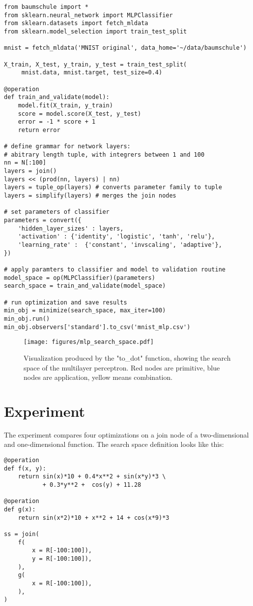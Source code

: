 \documentclass[english]{article}
\begin{document}
\begin{verbatim}
from baumschule import *
from sklearn.neural_network import MLPClassifier
from sklearn.datasets import fetch_mldata
from sklearn.model_selection import train_test_split

mnist = fetch_mldata('MNIST original', data_home='~/data/baumschule')

X_train, X_test, y_train, y_test = train_test_split(
     mnist.data, mnist.target, test_size=0.4)

@operation
def train_and_validate(model):
    model.fit(X_train, y_train)
    score = model.score(X_test, y_test)
    error = -1 * score + 1
    return error

# define grammar for network layers:
# abitrary length tuple, with integrers between 1 and 100
nn = N[:100]
layers = join()
layers << (prod(nn, layers) | nn)
layers = tuple_op(layers) # converts parameter family to tuple
layers = simplify(layers) # merges the join nodes

# set parameters of classifier
parameters = convert({
    'hidden_layer_sizes' : layers,
    'activation' : {'identity', 'logistic', 'tanh', 'relu'},
    'learning_rate' :  {'constant', 'invscaling', 'adaptive'},
})

# apply paramters to classifier and model to validation routine
model_space = op(MLPClassifier)(parameters)
search_space = train_and_validate(model_space)

# run optimization and save results
min_obj = minimize(search_space, max_iter=100)
min_obj.run()
min_obj.observers['standard'].to_csv('mnist_mlp.csv')

\end{verbatim}

\begin{figure}
  \texttt{[image: figures/mlp\_search\_space.pdf]}
  \caption{Visualization produced by the "to\_dot" function, showing the search space of the multilayer perceptron. Red nodes are primitive, blue nodes are application, yellow means combination.}
  \label{mlp_search_space}
\end{figure}

\newpage

\section{Experiment}

The experiment compares four optimizations on a join node of a two-dimensional and one-dimensional function. The search space definition looks like this:
\begin{verbatim}
@operation
def f(x, y):
    return sin(x)*10 + 0.4*x**2 + sin(x*y)*3 \
           + 0.3*y**2 +  cos(y) + 11.28

@operation
def g(x):
    return sin(x*2)*10 + x**2 + 14 + cos(x*9)*3

ss = join(
    f(
        x = R[-100:100]),
        y = R[-100:100]),
    ),
    g(
        x = R[-100:100]),
    ),
)
\end{verbatim}
\end{document}
